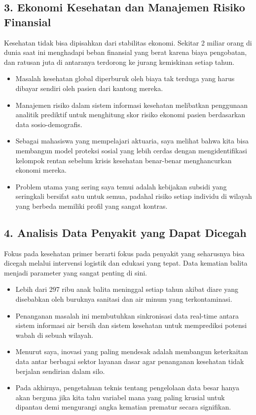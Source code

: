 \documentclass[
  letterpaper,
  DIV=11,
  numbers=noendperiod]{scrreprt}
\begin{document}
\subsection{3. Ekonomi Kesehatan dan Manajemen Risiko
Finansial}\label{ekonomi-kesehatan-dan-manajemen-risiko-finansial}

Kesehatan tidak bisa dipisahkan dari stabilitas ekonomi. Sekitar 2
miliar orang di dunia saat ini menghadapi beban finansial yang berat
karena biaya pengobatan, dan ratusan juta di antaranya terdorong ke
jurang kemiskinan setiap tahun.

\begin{itemize}
\item
  Masalah kesehatan global diperburuk oleh biaya tak terduga yang harus
  dibayar sendiri oleh pasien dari kantong mereka.
\item
  Manajemen risiko dalam sistem informasi kesehatan melibatkan
  penggunaan analitik prediktif untuk menghitung skor risiko ekonomi
  pasien berdasarkan data sosio-demografis.
\item
  Sebagai mahasiswa yang mempelajari aktuaria, saya melihat bahwa kita
  bisa membangun model proteksi sosial yang lebih cerdas dengan
  mengidentifikasi kelompok rentan sebelum krisis kesehatan benar-benar
  menghancurkan ekonomi mereka.
\item
  Problem utama yang sering saya temui adalah kebijakan subsidi yang
  seringkali bersifat satu untuk semua, padahal risiko setiap individu
  di wilayah yang berbeda memiliki profil yang sangat kontras.
\end{itemize}

\subsection{4. Analisis Data Penyakit yang Dapat
Dicegah}\label{analisis-data-penyakit-yang-dapat-dicegah}

Fokus pada kesehatan primer berarti fokus pada penyakit yang seharusnya
bisa dicegah melalui intervensi logistik dan edukasi yang tepat. Data
kematian balita menjadi parameter yang sangat penting di sini.

\begin{itemize}
\item
  Lebih dari 297 ribu anak balita meninggal setiap tahun akibat diare
  yang disebabkan oleh buruknya sanitasi dan air minum yang
  terkontaminasi.
\item
  Penanganan masalah ini membutuhkan sinkronisasi data real-time antara
  sistem informasi air bersih dan sistem kesehatan untuk memprediksi
  potensi wabah di sebuah wilayah.
\item
  Menurut saya, inovasi yang paling mendesak adalah membangun
  keterkaitan data antar berbagai sektor layanan dasar agar penanganan
  kesehatan tidak berjalan sendirian dalam silo.
\item
  Pada akhirnya, pengetahuan teknis tentang pengelolaan data besar hanya
  akan berguna jika kita tahu variabel mana yang paling krusial untuk
  dipantau demi mengurangi angka kematian prematur secara signifikan.
\end{itemize}
\end{document}
